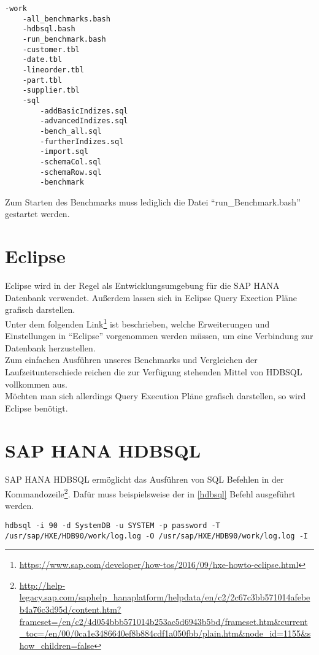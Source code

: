 \begin{lstlisting}[label=struktur, caption={Ordnerstruktur}]
-work
	-all_benchmarks.bash
	-hdbsql.bash
	-run_benchmark.bash
	-customer.tbl
	-date.tbl
	-lineorder.tbl
	-part.tbl
	-supplier.tbl
	-sql
		-addBasicIndizes.sql
		-advancedIndizes.sql
		-bench_all.sql
		-furtherIndizes.sql
		-import.sql
		-schemaCol.sql
		-schemaRow.sql
		-benchmark	
\end{lstlisting}
Zum Starten des Benchmarks muss lediglich die Datei \enquote{run\_Benchmark.bash} gestartet werden.


\section{Eclipse}
Eclipse wird in der Regel als Entwicklungsumgebung für die SAP HANA Datenbank verwendet. Außerdem lassen sich in Eclipse Query Exection Pläne grafisch darstellen.
\\Unter dem folgenden Link\footnote{\url{https://www.sap.com/developer/how-tos/2016/09/hxe-howto-eclipse.html}} ist beschrieben, welche Erweiterungen und Einstellungen in \enquote{Eclipse} vorgenommen werden müssen, um eine Verbindung zur Datenbank herzustellen.\\Zum einfachen Ausführen unseres Benchmarks und Vergleichen der Laufzeitunterschiede reichen die zur Verfügung stehenden Mittel von HDBSQL vollkommen aus.\\Möchten man sich allerdings Query Execution Pläne grafisch darstellen, so wird Eclipse benötigt.

\section{SAP HANA HDBSQL}
SAP HANA HDBSQL ermöglicht das Ausführen von SQL Befehlen in der Kommandozeile\footnote{\url{http://help-legacy.sap.com/saphelp_hanaplatform/helpdata/en/c2/2c67c3bb571014afebeb4a76c3d95d/content.htm?frameset=/en/c2/4d054bbb571014b253ac5d6943b5bd/frameset.htm&current_toc=/en/00/0ca1e3486640ef8b884cdf1a050fbb/plain.htm&node_id=1155&show_children=false}}. Dafür muss beispielsweise der in \autoref{hdbsql} Befehl ausgeführt werden.
\begin{lstlisting}[label=hdbsql, caption={HDBSQL Befehl}]
hdbsql -i 90 -d SystemDB -u SYSTEM -p password -T /usr/sap/HXE/HDB90/work/log.log -O /usr/sap/HXE/HDB90/work/log.log -I
\end{lstlisting}
